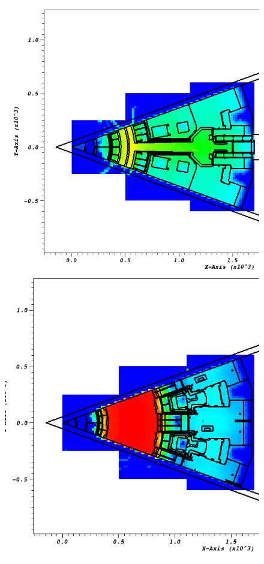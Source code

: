 \documentclass[12pt]{article}
\begin{document}
\begin{figure}[ht!]
  \centering
  \includegraphics[scale=0.27]{../plots/neutron/b4c/flux_z-500.png}
  \includegraphics[scale=0.27]{../plots/neutron/b4c/flux_z0.png}       

\end{figure}
\end{document}
